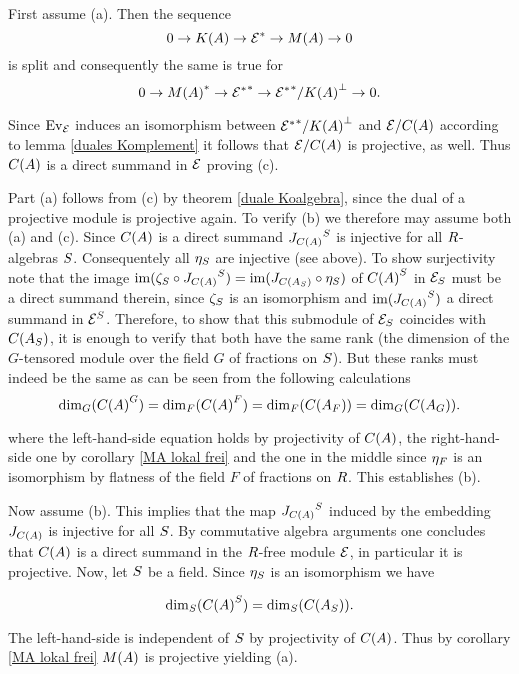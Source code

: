 \documentclass[twoside,12pt]{article}
\begin{document}
\begin{Pf}
First assume (a). Then the sequence
\[ 0\rightarrow K(A)\rightarrow {{\cal E}}^* \rightarrow M(A)\rightarrow 0 \]
is split and consequently the same is true for
\[ 0\rightarrow {M(A)}^*\rightarrow {{{\cal E}}^*}^* \rightarrow {{{\cal E}}^*}^*/{K(A)}^{\bot}\rightarrow 0. \]

Since ${\rm Ev}_{{\cal E}}$ induces an isomorphism between
${{{\cal E}}^*}^*/{K(A)}^{\bot}$ and ${\cal E} /C(A)$
according to lemma \ref{duales Komplement} it follows
that ${\cal E} /C(A)$ is projective, as well. Thus
$C(A)$ is a direct summand in ${\cal E}$
proving (c).\Ab

Part (a) follows from (c) by theorem \ref{duale Koalgebra}, since the
dual of a projective module is projective again.
To verify (b) we therefore may assume both (a) and (c). Since $C(A)$
is a direct summand ${J_{C(A)}}^{S}$ is injective for all $R$-algebras
$S$. Consequentely all
${\eta}_{S}$ are injective (see above). To show surjectivity note that the image
${\rm im}({\zeta}_{S} \circ{J_{C(A)}}^{S})=
{\rm im}(J_{C({A}_{S})}\circ {\eta}_{S})$ of ${C(A)}^{S}$ in ${{\cal E}}_{S}$
must be a direct summand therein, since ${\zeta}_{S}$
is an isomorphism and ${\rm im}({J_{C(A)}}^{S})$ a direct summand in ${{\cal E}}^{S}$.
Therefore, to show that this submodule of ${{\cal E}}_{S}$ 
coincides with $C({A}_{S})$, it is enough to verify that both
have the same rank (the dimension of the $G$-tensored module
over the field $G$ of fractions on $S$). But these ranks must indeed be
the same as can be seen from the following calculations
\[ {\rm dim}_{G}{({C(A)}^{G})}={\rm dim}_{F}{({C(A)}^{F})}={\rm dim}_{F}{(C({A}_{F}))}=
{\rm dim}_{G}{(C({A}_{G}))}.\]

where the left-hand-side equation holds by projectivity of $C(A)$, the right-hand-side one
by corollary \ref{MA lokal frei} and the one in the middle
since ${\eta}_{F}$
is an isomorphism by flatness of the field $F$ of fractions on $R$. 
This establishes (b).\Ab

Now assume (b). This implies that the map ${J_{C(A)}}^{S}$ induced by
the embedding $J_{C(A)}$ is injective for all $S$. By
commutative algebra arguments one concludes that $C(A)$ is a direct
summand in the $R$-free module ${\cal E}$, in particular it is
projective. Now, let $S$ be a field.
Since ${\eta}_{S}$ is an isomorphism we have

\[ {\rm dim}_{S}{({C(A)}^{S})}= {\rm dim}_{S}{(C({A}_{S}))}.\]

The left-hand-side is independent of $S$ by projectivity of $C(A)$. Thus by corollary \ref{MA lokal frei} $M(A)$ is projective yielding
(a).
\end{Pf}
\end{document}
